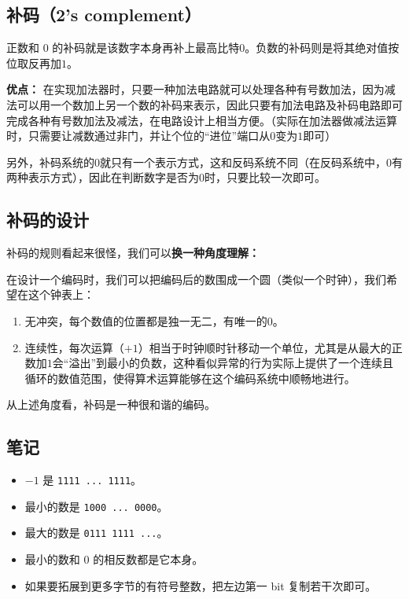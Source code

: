 \subsection{补码（2's complement）}

正数和 $0$ 的补码就是该数字本身再补上最高比特$0$。负数的补码则是将其绝对值按位取反再加$1$。

\textbf{优点：}
在实现加法器时，只要一种加法电路就可以处理各种有号数加法，因为减法可以用一个数加上另一个数的补码来表示，因此只要有加法电路及补码电路即可完成各种有号数加法及减法，在电路设计上相当方便。（实际在加法器做减法运算时，只需要让减数通过非门，并让个位的“进位”端口从$0$变为$1$即可）

另外，补码系统的$0$就只有一个表示方式，这和反码系统不同（在反码系统中，$0$有两种表示方式），因此在判断数字是否为$0$时，只要比较一次即可。


\subsection{补码的设计}

补码的规则看起来很怪，我们可以\textbf{换一种角度理解：}

在设计一个编码时，我们可以把编码后的数围成一个圆（类似一个时钟），我们希望在这个钟表上：
\begin{enumerate}
\item 
无冲突，每个数值的位置都是独一无二，有唯一的$0$。
\item 
连续性，每次运算（$+1$）相当于时钟顺时针移动一个单位，尤其是从最大的正数加$1$会“溢出”到最小的负数，这种看似异常的行为实际上提供了一个连续且循环的数值范围，使得算术运算能够在这个编码系统中顺畅地进行。
\end{enumerate}

从上述角度看，补码是一种很和谐的编码。


\subsection{笔记}
\begin{itemize}
\item $-1$ 是 \verb`1111 ... 1111`。
\item 最小的数是 \verb`1000 ... 0000`。
\item 最大的数是 \verb`0111 1111 ...`。
\item 最小的数和 $0$ 的相反数都是它本身。
\item 如果要拓展到更多字节的有符号整数，把左边第一 bit 复制若干次即可。
\end{itemize}
